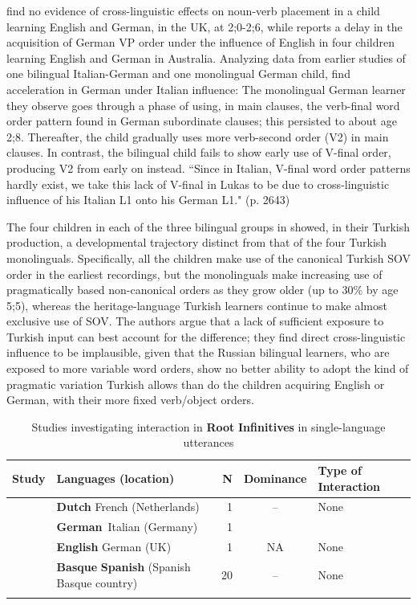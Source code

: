 \documentclass[output=paper]{langscibook}
\begin{document}
\citet{SinkaSchelleter1998} find no evidence of cross-linguistic effects on noun-verb placement in a child learning English and German, in the UK, at 2;0-2;6, while \citet{Dopke1998,Döpke2000} reports a delay in the acquisition of German VP order under the influence of English in four children learning English and German in Australia. Analyzing data from earlier studies of one bilingual Italian-German and one monolingual German child, \citet{Hauser-GrüdlEtAl2010} find acceleration in German under Italian influence: The monolingual German learner they observe goes through a phase of using, in main clauses, the verb-final word order pattern found in German subordinate clauses; this persisted to about age 2;8. Thereafter, the child gradually uses more verb-second order (V2) in main clauses. In contrast, the bilingual child fails to show early use of V-final order, producing V2 from early on instead. ``Since in Italian, V-final word order patterns hardly exist, we take this lack of V-final in Lukas to be due to cross-linguistic influence of his Italian L1 onto his German L1." (p. 2643)

The four children in each of the three bilingual groups in \citet{SağınŞimşekAntonovaÜnlü2021} showed, in their Turkish production, a developmental trajectory distinct from that of the four Turkish monolinguals. Specifically, all the children make use of the canonical Turkish SOV order in the earliest recordings, but the monolinguals make increasing use of pragmatically based non-canonical orders as they grow older (up to 30\% by age 5;5), whereas the heritage-language Turkish learners continue to make almost exclusive use of SOV. The authors argue that a lack of sufficient exposure to Turkish input can best account for the difference; they find direct cross-linguistic influence to be implausible, given that the Russian bilingual learners, who are exposed to more variable word orders, show no better ability to adopt the kind of pragmatic variation Turkish allows than do the children acquiring English or German, with their more fixed verb/object orders.

\begin{table}[b]
\begin{tabularx}{\textwidth}{QQ@{}rcQ}
\lsptoprule
{ Study} & { Languages} { (location)} & { N}  & { Dominance} & {{ Type of Interaction}}\\
\midrule
\citet{HulkMüller2000} & \textbf{Dutch} French (Netherlands) & 1 & – &{None}\\
& \textbf{German}~Italian (Germany) & 1 &  &   \\
\tablevspace
 \citet{Unsworth2003} & \textbf{English} German (UK) & 1 & NA & {None}\\
\tablevspace
 \citet{Austin2009} & \textbf{Basque} \textbf{Spanish} (Spanish Basque country) & 20 & – &{None}\\
\lspbottomrule
\end{tabularx}
\caption{Studies investigating interaction in \textbf{Root} \textbf{Infinitives} in single-language utterances}
\label{tab:vihmannvihmann:7}
\end{table}
\end{document}
